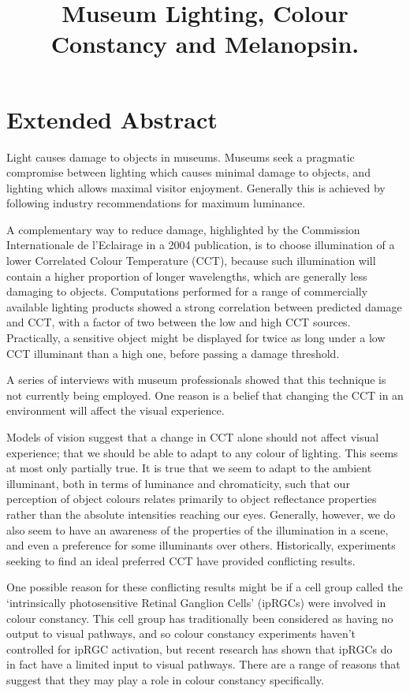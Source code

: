 \documentclass{article}
\title{Museum Lighting, Colour Constancy and Melanopsin.}
\date{}
\begin{document}
\maketitle

\section{Extended Abstract}

Light causes damage to objects in museums. Museums seek a pragmatic compromise between lighting which causes minimal damage to objects, and lighting which allows maximal visitor enjoyment. Generally this is achieved by following industry recommendations for maximum luminance.

A complementary way to reduce damage, highlighted by the Commission Internationale de l'Eclairage in a 2004 publication, is to choose illumination of a lower Correlated Colour Temperature (CCT), because such illumination will contain a higher proportion of longer wavelengths, which are generally less damaging to objects. Computations performed for a range of commercially available lighting products showed a strong correlation between predicted damage and CCT, with a factor of two between the low and high CCT sources. Practically, a sensitive object might be displayed for twice as long under a low CCT illuminant than a high one, before passing a damage threshold. 

A series of interviews with museum professionals showed that this technique is not currently being employed. One reason is a belief that changing the CCT in an environment will affect the visual experience.

Models of vision suggest that a change in CCT alone should not affect visual experience; that we should be able to adapt to any colour of lighting. This seems at most only partially true. It is true that we seem to adapt to the ambient illuminant, both in terms of luminance and chromaticity, such that our perception of object colours relates primarily to object reflectance properties rather than the absolute intensities reaching our eyes. Generally, however, we do also seem to have an awareness of the properties of the illumination in a scene, and even a preference for some illuminants over others. Historically, experiments seeking to find an ideal preferred CCT have provided conflicting results.

One possible reason for these conflicting results might be if a cell group called the `intrinsically photosensitive Retinal Ganglion Cells' (ipRGCs) were involved in colour constancy. This cell group has traditionally been considered as having no output to visual pathways, and so colour constancy experiments haven't controlled for ipRGC activation, but recent research has shown that ipRGCs do in fact have a limited input to visual pathways. There are a range of reasons that suggest that they may play a role in colour constancy specifically.
\end{document}
